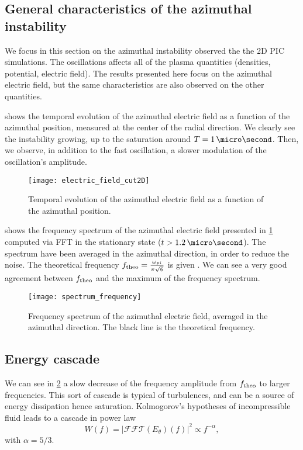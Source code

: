   \subsection{General characteristics of the azimuthal instability }
  
  We focus in this section on the azimuthal instability observed the the \ac{2D} \ac{PIC} simulations.
  The oscillations affects all of the plasma quantities (densities, potential, electric field).
  The results presented here focus on the azimuthal electric field, but the same characteristics are also observed on the other quantities.
  
   shows the temporal evolution of the azimuthal electric field as a function of the azimuthal position, measured at the center of the radial direction.
  We clearly see the instability growing, up to the saturation around $T=1\,\micro\second$.
  Then, we observe, in addition to the fast oscillation, a slower modulation of the oscillation's amplitude. 
  \begin{figure}[hbtp]
    \centering
    \texttt{[image: electric\_field\_cut2D]}
    \caption{Temporal evolution of the azimuthal electric field as a function of the azimuthal position.}
    \label{fig-2DcutEx}
  \end{figure}

   shows the frequency spectrum of the azimuthal electric field presented in \cref{fig-2DcutEx} computed via \ac{FFT} in the stationary state ($t > 1.2\,\micro\second$).
  The spectrum have been averaged in the azimuthal direction, in order to reduce the noise.
  The theoretical frequency $f_{\rm theo} = \frac{\omega_{pi}}{\pi \sqrt{6} }$ is given \citep{croes2018}. 
  We can see a very good agreement between $f_{\rm theo}$ and the maximum of the frequency spectrum.
  \begin{figure}[hbtp]
    \centering
    \texttt{[image: spectrum\_frequency]}
    \caption{Frequency spectrum of the azimuthal electric field, averaged in the azimuthal direction. The black line is the theoretical frequency.}
    \label{fig-FFT_ex}
  \end{figure}
  
  \subsection{Energy cascade} \label{subsec-turbul}
  
  We can see in \cref{fig-FFT_ex} a slow decrease of the frequency amplitude from $f_{\rm theo}$ to larger frequencies.
  This sort of cascade is typical of turbulences, and can be a source of energy dissipation hence saturation.
  Kolmogorov's hypotheses of incompressible fluid leads to a cascade in power law \[ W(f) = | \mathcal{FFT}(E_{\theta})(f) |^2 \propto f ^ {- \alpha}, \]
  with $\alpha = 5/3$.
  
